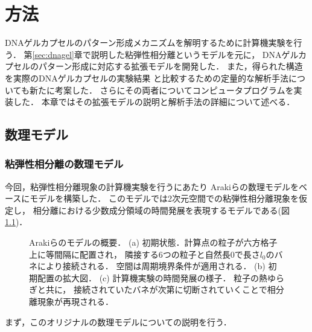\chapter{方法}
\label{sec:model}

DNAゲルカプセルのパターン形成メカニズムを解明するために計算機実験を行う．
第\ref{sec:dnagel}章で説明した粘弾性相分離というモデルを元に，
DNAゲルカプセルのパターン形成に対応する拡張モデルを開発した．
また，得られた構造を実際のDNAゲルカプセルの実験結果\cite{moritasan}
と比較するための定量的な解析手法についても新たに考案した．
さらにその両者についてコンピュータプログラムを実装した．
本章ではその拡張モデルの説明と解析手法の詳細について述べる．


\section{数理モデル}


\subsection{粘弾性相分離の数理モデル}
今回，粘弾性相分離現象の計算機実験を行うにあたり
Arakiらの数理モデル\cite{araki2005simple}をベースにモデルを構築した．
このモデルでは2次元空間での粘弾性相分離現象を仮定し，
相分離における少数成分領域の時間発展を表現するモデルである(図\ref{fig:model_2d})．
\begin{figure}
\centering

\caption{
    Arakiらのモデル\cite{araki2005simple}の概要．
    (a) 初期状態．計算点の粒子が六方格子上に等間隔に配置され，
        隣接する6つの粒子と自然長$0$で長さ$l_0$のバネにより接続される．
        空間は周期境界条件が適用される．
    (b) 初期配置の拡大図．
    (c) 計算機実験の時間発展の様子．
        粒子の熱ゆらぎと共に，
        接続されていたバネが次第に切断されていくことで相分離現象が再現される．
}
\label{fig:model_2d}
\end{figure}
まず，このオリジナルの数理モデルについての説明を行う．

